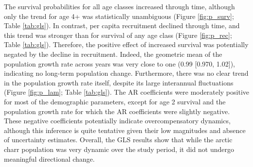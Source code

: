 The survival probabilities for all age classes increased through time,
although only the trend for age 4+ was statistically unambiguous 
(Figure \ref{fig:p_surv}; Table \ref{tab:gls}).
In contrast, per capita recruitment declined through time, 
and this trend was stronger than for survival of any age class
(Figure \ref{fig:p_rec}; Table \ref{tab:gls}).
Therefore, the positive effect of increased survival 
was potentially negated by the decline in recruitment.
Indeed, the geometric mean of the population growth rate across years was very close to one
(0.99 [0.970, 1.02]), indicating no long-term population change.
Furthermore, there was no clear trend in the population growth rate itself,
despite its large interannual fluctuations
(Figure \ref{fig:p_lam}; Table \ref{tab:gls}).
The AR coefficients were moderately positive for most of the demographic parameters,
except for age 2 survival and the population growth rate 
for which the AR coefficients were slightly negative.
These negative coefficients potentially indicate overcompensatory dynamics,
although this inference is quite tentative given their low magnitudes 
and absence of uncertainty estimates.
Overall, the GLS results show that while the arctic charr population was very dynamic
over the study period, it did not undergo meaningful directional change.